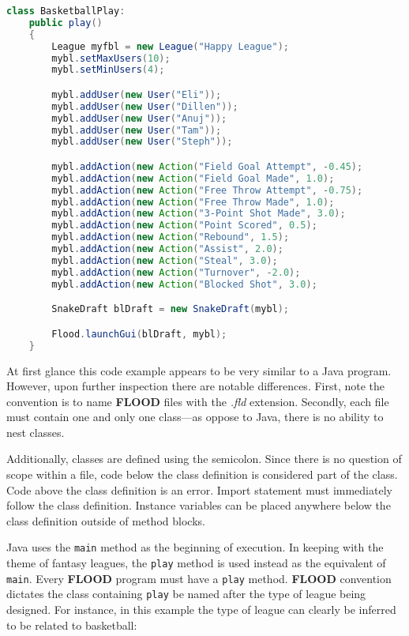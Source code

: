 \documentclass[12pt]{report}
\begin{document}
\begin{singlespace}
\begin{lstlisting}[language=Java,label=some-code,caption=BasketballPlay.fld]
class BasketballPlay:
	public play()
	{
		League myfbl = new League("Happy League");
		mybl.setMaxUsers(10);
		mybl.setMinUsers(4);

		mybl.addUser(new User("Eli"));
		mybl.addUser(new User("Dillen"));
		mybl.addUser(new User("Anuj"));
		mybl.addUser(new User("Tam"));
		mybl.addUser(new User("Steph"));

		mybl.addAction(new Action("Field Goal Attempt", -0.45);
		mybl.addAction(new Action("Field Goal Made", 1.0);
		mybl.addAction(new Action("Free Throw Attempt", -0.75);
		mybl.addAction(new Action("Free Throw Made", 1.0);
		mybl.addAction(new Action("3-Point Shot Made", 3.0);
		mybl.addAction(new Action("Point Scored", 0.5);
		mybl.addAction(new Action("Rebound", 1.5);
		mybl.addAction(new Action("Assist", 2.0);
		mybl.addAction(new Action("Steal", 3.0);
		mybl.addAction(new Action("Turnover", -2.0);
		mybl.addAction(new Action("Blocked Shot", 3.0);

		SnakeDraft blDraft = new SnakeDraft(mybl);

		Flood.launchGui(blDraft, mybl);
	}
\end{lstlisting}
\end{singlespace}

At first glance this code example appears to be very similar to a Java program. However, upon further inspection there are notable differences. First, note the convention is to name \textbf{FLOOD} files with the \textit{.fld} extension. Secondly, each file must contain one and only one class---as oppose to Java, there is no ability to nest classes.

Additionally, classes are defined using the semicolon. Since there is no question of scope within a file, code below the class definition is considered part of the class. Code above the class definition is an error. Import statement must immediately follow the class definition. Instance variables can be placed anywhere below the class definition outside of method blocks.

Java uses the \texttt{main} method as the beginning of execution. In keeping with the theme of fantasy leagues, the \texttt{play} method is used instead as the equivalent of \texttt{main}. Every \textbf{FLOOD} program must have a \texttt{play} method. \textbf{FLOOD} convention dictates the class containing \texttt{play} be named after the type of league being designed. For instance, in this example the type of league can clearly be inferred to be related to basketball:
\end{document}
